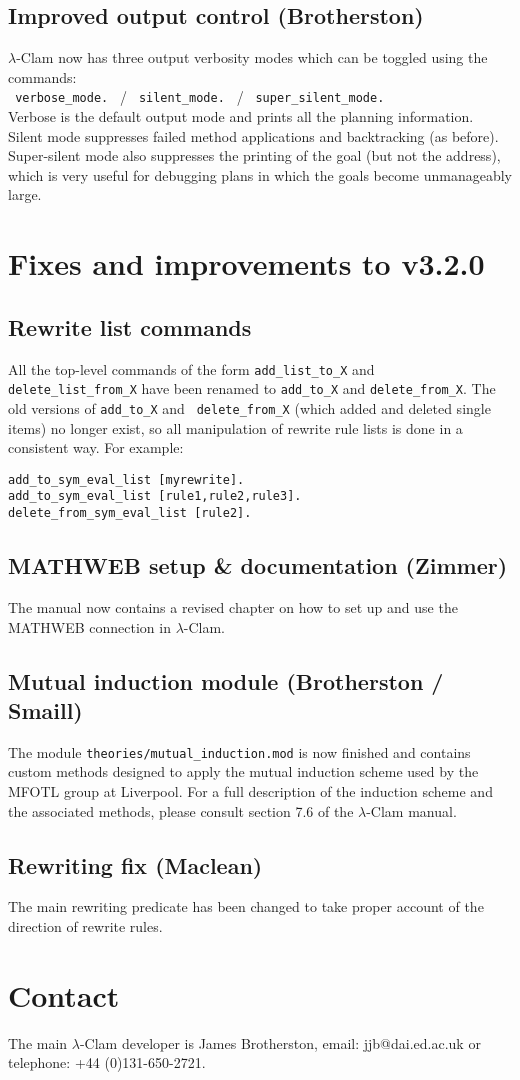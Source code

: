 \documentclass[11pt]{article}
\begin{document}
\subsection{Improved output control (Brotherston)}
$\lambda$-Clam now has three output verbosity modes which can be toggled using the commands: \\

\verb+ verbose_mode. + / \verb+ silent_mode. + / \verb+ super_silent_mode. + \\

\noindent 
Verbose is the default output mode and prints all the planning
information.  Silent mode suppresses failed method applications and
backtracking (as before).  Super-silent mode also suppresses the
printing of the goal (but not the address), which is very useful for
debugging plans in which the goals become unmanageably large.  


\section{Fixes and improvements to v3.2.0}

\subsection{Rewrite list commands}
All the top-level commands of the form {\tt add\_list\_to\_X} and {\tt
  delete\_list\_from\_X} have been renamed to {\tt add\_to\_X} and
{\tt delete\_from\_X}.  The old versions of {\tt add\_to\_X} and {\tt
  delete\_from\_X} (which added and deleted single items) no longer
exist, so all manipulation of rewrite rule lists is done in a
consistent way.  For example:
\begin{verbatim}
add_to_sym_eval_list [myrewrite].
add_to_sym_eval_list [rule1,rule2,rule3].
delete_from_sym_eval_list [rule2].
\end{verbatim}

\subsection{MATHWEB setup \& documentation (Zimmer)}
The manual now contains a revised chapter on how to set up and use the
MATHWEB connection in $\lambda$-Clam.  

\subsection{Mutual induction module (Brotherston / Smaill)}
The module \texttt{theories/mutual\_induction.mod} is now finished and
contains custom methods designed to apply the mutual induction scheme
used by the MFOTL group at Liverpool.  For a full description of the
induction scheme and the associated methods, please consult section
7.6 of the $\lambda$-Clam manual.

\subsection{Rewriting fix (Maclean)}
The main rewriting predicate has been changed to take proper account
of the direction of rewrite rules.

\section{Contact}
The main $\lambda$-Clam developer is James Brotherston, email:
jjb@dai.ed.ac.uk or telephone: +44 (0)131-650-2721.
\end{document}
